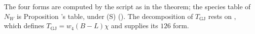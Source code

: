 The four forms are computed by the script as in the theorem; the species table of $N_{W}$ is Proposition 's table, under (S) (). The decomposition of $T_{\mathrm{GJ}}$ rests on , which defines $T_{\mathrm{GJ}} = w_{4}(B - L)\chi$ and supplies its $126$ form.
